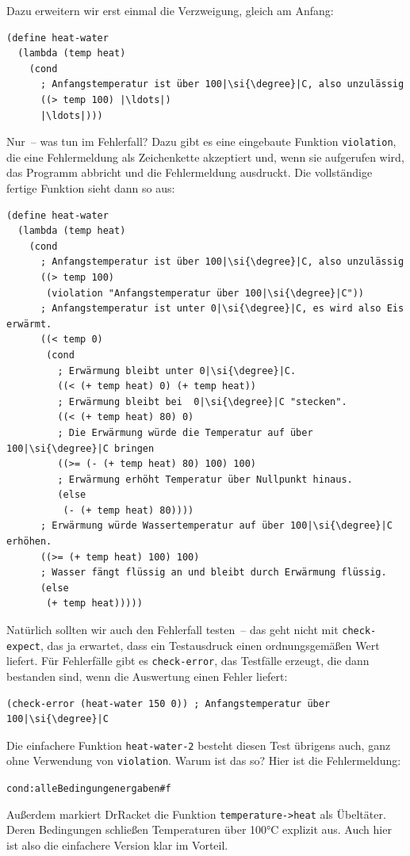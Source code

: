 Dazu erweitern wir erst einmal die Verzweigung, gleich am Anfang:
%
\begin{lstlisting}
(define heat-water
  (lambda (temp heat)
    (cond
      ; Anfangstemperatur ist über 100|\si{\degree}|C, also unzulässig
      ((> temp 100) |\ldots|)
      |\ldots|)))
\end{lstlisting}
%
Nur~-- was tun im Fehlerfall?  Dazu gibt es eine eingebaute Funktion
\lstinline{violation},\label{sec:violation} die eine Fehlermeldung als Zeichenkette akzeptiert
und, wenn sie aufgerufen wird, das Programm abbricht und die
Fehlermeldung ausdruckt.  Die vollständige fertige Funktion sieht
dann so aus:
%
\begin{lstlisting}
(define heat-water
  (lambda (temp heat)
    (cond
      ; Anfangstemperatur ist über 100|\si{\degree}|C, also unzulässig
      ((> temp 100)
       (violation "Anfangstemperatur über 100|\si{\degree}|C"))
      ; Anfangstemperatur ist unter 0|\si{\degree}|C, es wird also Eis erwärmt.
      ((< temp 0)
       (cond
         ; Erwärmung bleibt unter 0|\si{\degree}|C.
         ((< (+ temp heat) 0) (+ temp heat))
         ; Erwärmung bleibt bei  0|\si{\degree}|C "stecken".
         ((< (+ temp heat) 80) 0)
         ; Die Erwärmung würde die Temperatur auf über 100|\si{\degree}|C bringen
         ((>= (- (+ temp heat) 80) 100) 100)
         ; Erwärmung erhöht Temperatur über Nullpunkt hinaus.
         (else
          (- (+ temp heat) 80))))
      ; Erwärmung würde Wassertemperatur auf über 100|\si{\degree}|C erhöhen.
      ((>= (+ temp heat) 100) 100)
      ; Wasser fängt flüssig an und bleibt durch Erwärmung flüssig.
      (else
       (+ temp heat)))))
\end{lstlisting}
%
Natürlich sollten wir auch den Fehlerfall testen~-- das geht nicht mit
\lstinline{check-expect}, das ja erwartet, dass ein Testausdruck einen
ordnungsgemäßen Wert liefert.  Für Fehlerfälle gibt es
\lstinline{check-error}, das Testfälle erzeugt, die dann bestanden sind,
wenn die Auswertung einen Fehler liefert:
%
\begin{lstlisting}
(check-error (heat-water 150 0)) ; Anfangstemperatur über 100|\si{\degree}|C
\end{lstlisting}
%
Die einfachere Funktion \lstinline{heat-water-2} besteht diesen Test
übrigens auch, ganz ohne Verwendung von \lstinline{violation}.  Warum ist das so?
Hier ist die Fehlermeldung:
%
\begin{alltt}
{\color{red}cond: alle Bedingungen ergaben #f}
\end{alltt}
%
Außerdem markiert DrRacket die Funktion \lstinline{temperature->heat}
als Übeltäter.  Deren Bedingungen schließen Temperaturen über 100\si{\degree}C
explizit aus.  Auch hier ist also die einfachere Version klar im
Vorteil.

